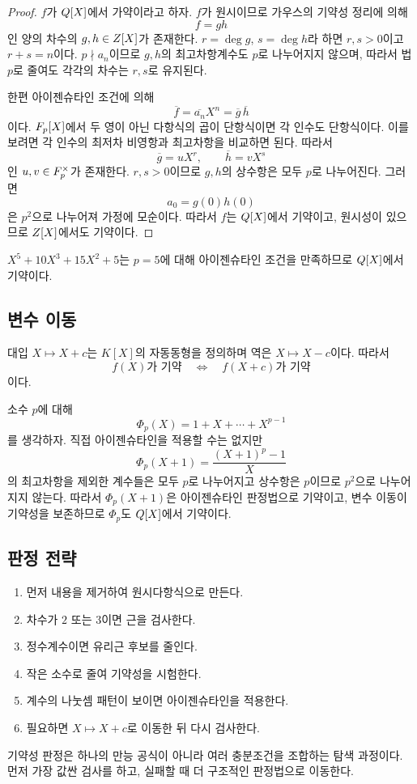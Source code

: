 \begin{proof}
$f$가 $Q[X]$에서 가약이라고 하자. $f$가 원시이므로 가우스의 기약성 정리에 의해
\[
  f=gh
\]
인 양의 차수의 $g,h\in Z[X]$가 존재한다. $r=\deg g$, $s=\deg h$라 하면 $r,s>0$이고 $r+s=n$이다. $p\nmid a_n$이므로 $g,h$의 최고차항계수도 $p$로 나누어지지 않으며, 따라서 법 $p$로 줄여도 각각의 차수는 $r,s$로 유지된다.

한편 아이젠슈타인 조건에 의해
\[
  \overline f=\overline{a_n}X^n
  =\overline g\,\overline h
\]
이다. $F_p[X]$에서 두 영이 아닌 다항식의 곱이 단항식이면 각 인수도 단항식이다. 이를 보려면 각 인수의 최저차 비영항과 최고차항을 비교하면 된다. 따라서
\[
  \overline g=uX^r,
  \qquad
  \overline h=vX^s
\]
인 $u,v\in F_p^\times$가 존재한다. $r,s>0$이므로 $g,h$의 상수항은 모두 $p$로 나누어진다. 그러면
\[
  a_0=g(0)h(0)
\]
은 $p^2$으로 나누어져 가정에 모순이다. 따라서 $f$는 $Q[X]$에서 기약이고, 원시성이 있으므로 $Z[X]$에서도 기약이다.
\end{proof}

\begin{example}
$X^5+10X^3+15X^2+5$는 $p=5$에 대해 아이젠슈타인 조건을 만족하므로 $Q[X]$에서 기약이다.
\end{example}

\subsection{변수 이동}

대입 $X\mapsto X+c$는 $K[X]$의 자동동형을 정의하며 역은 $X\mapsto X-c$이다. 따라서
\[
  f(X)\text{가 기약}
  \quad\Longleftrightarrow\quad
  f(X+c)\text{가 기약}
\]
이다.

\begin{example}[소수 차수 원분다항식]
소수 $p$에 대해
\[
 \Phi_p(X)=1+X+\cdots+X^{p-1}
\]
를 생각하자. 직접 아이젠슈타인을 적용할 수는 없지만
\[
 \Phi_p(X+1)=\frac{(X+1)^p-1}{X}
\]
의 최고차항을 제외한 계수들은 모두 $p$로 나누어지고 상수항은 $p$이므로 $p^2$으로 나누어지지 않는다. 따라서 $\Phi_p(X+1)$은 아이젠슈타인 판정법으로 기약이고, 변수 이동이 기약성을 보존하므로 $\Phi_p$도 $Q[X]$에서 기약이다.
\end{example}

\subsection{판정 전략}

\begin{enumerate}
  \item 먼저 내용을 제거하여 원시다항식으로 만든다.
  \item 차수가 $2$ 또는 $3$이면 근을 검사한다.
  \item 정수계수이면 유리근 후보를 줄인다.
  \item 작은 소수로 줄여 기약성을 시험한다.
  \item 계수의 나눗셈 패턴이 보이면 아이젠슈타인을 적용한다.
  \item 필요하면 $X\mapsto X+c$로 이동한 뒤 다시 검사한다.
\end{enumerate}

\begin{keyidea}
기약성 판정은 하나의 만능 공식이 아니라 여러 충분조건을 조합하는 탐색 과정이다. 먼저 가장 값싼 검사를 하고, 실패할 때 더 구조적인 판정법으로 이동한다.
\end{keyidea}
